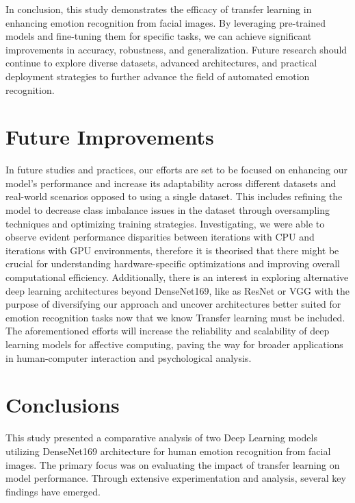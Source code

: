 \documentclass[conference]{IEEEtran}
\begin{document}
In conclusion, this study demonstrates the efficacy of transfer learning in enhancing emotion recognition from facial images. By leveraging pre-trained models and fine-tuning them for specific tasks, we can achieve significant improvements in accuracy, robustness, and generalization. Future research should continue to explore diverse datasets, advanced architectures, and practical deployment strategies to further advance the field of automated emotion recognition.


\section{Future Improvements}
In future studies and practices, our efforts are set to be focused on enhancing our model's performance and increase its adaptability across different datasets and real-world scenarios opposed to using a single dataset. This includes refining the model to decrease class imbalance issues in the dataset through oversampling techniques and optimizing training strategies. Investigating, we were able to observe evident performance disparities between iterations with CPU and iterations with GPU environments, therefore it is theorised that there might be crucial for understanding hardware-specific optimizations and improving overall computational efficiency. Additionally, there is an interest in exploring alternative deep learning architectures beyond DenseNet169, like as ResNet or VGG with the purpose of diversifying our approach and uncover architectures better suited for emotion recognition tasks now that we know Transfer learning must be included. The aforementioned efforts will increase the reliability and scalability of deep learning models for affective computing, paving the way for broader applications in human-computer interaction and psychological analysis.



\section{Conclusions}
This study presented a comparative analysis of two Deep Learning models utilizing DenseNet169 architecture for human emotion recognition from facial images. The primary focus was on evaluating the impact of transfer learning on model performance. Through extensive experimentation and analysis, several key findings have emerged.
\end{document}
